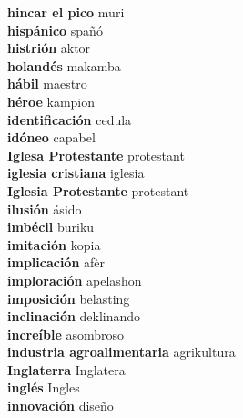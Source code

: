 \textbf{ hincar el pico  } muri \\
\textbf{ hispánico  } spañó \\
\textbf{ histrión  } aktor \\
\textbf{ holandés  } makamba \\
\textbf{ hábil  } maestro \\
\textbf{ héroe  } kampion \\
\textbf{ identificación  } cedula \\
\textbf{ idóneo  } capabel \\
\textbf{ Iglesa Protestante  } protestant \\
\textbf{ iglesia cristiana  } iglesia \\
\textbf{ Iglesia Protestante  } protestant \\
\textbf{ ilusión  } ásido \\
\textbf{ imbécil  } buriku \\
\textbf{ imitación  } kopia \\
\textbf{ implicación  } afèr \\
\textbf{ imploración  } apelashon \\
\textbf{ imposición  } belasting \\
\textbf{ inclinación  } deklinando \\
\textbf{ increíble  } asombroso \\
\textbf{ industria agroalimentaria  } agrikultura \\
\textbf{ Inglaterra  } Inglatera \\
\textbf{ inglés  } Ingles \\
\textbf{ innovación  } diseño \\
